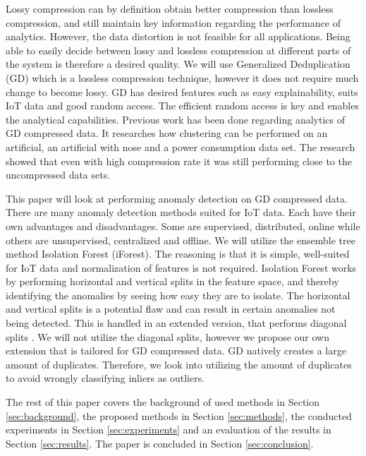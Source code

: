 Lossy compression can by definition obtain better compression than lossless compression, and still maintain key information regarding the performance of analytics. However, the data distortion is not feasible for all applications. Being able to easily decide between lossy and lossless compression at different parts of the system is therefore a desired quality. We will use Generalized Deduplication\cite{gen-deduplication} (GD) which is a lossless compression technique, however it does not require much change to become lossy. GD has desired features such as easy explainability, suits IoT data and good random access. The efficient random access is key and enables the analytical capabilities. Previous work has been done regarding analytics of GD compressed data\cite{dir-analytics-gd}. It researches how clustering can be performed on an artificial, an artificial with nose and a power consumption data set. The research showed that even with high compression rate it was still performing close to the uncompressed data sets.               

This paper will look at performing anomaly detection on GD compressed data. There are many anomaly detection methods suited for IoT data\cite{survey_outlier}. Each have their own advantages and disadvantages. Some are supervised, distributed, online while others are unsupervised, centralized and offline. We will utilize the ensemble tree method Isolation Forest (iForest). The reasoning is that it is simple, well-suited for IoT data and normalization of features is not required. Isolation Forest works by performing horizontal and vertical splits in the feature space, and thereby identifying the anomalies by seeing how easy they are to isolate. The horizontal and vertical splits is a potential flaw and can result in certain anomalies not being detected. This is handled in an extended version, that performs diagonal splits \cite{extended-iforest}. We will not utilize the diagonal splits, however we propose our own extension that is tailored for GD compressed data. GD natively creates a large amount of duplicates. Therefore, we look into utilizing the amount of duplicates to avoid wrongly classifying inliers as outliers. 

The rest of this paper covers the background of used methods in Section \ref{sec:background}, the proposed methods in Section \ref{sec:methods}, the conducted experiments in Section \ref{sec:experiments} and an evaluation of the results in Section \ref{sec:results}. The paper is concluded in Section \ref{sec:conclusion}.